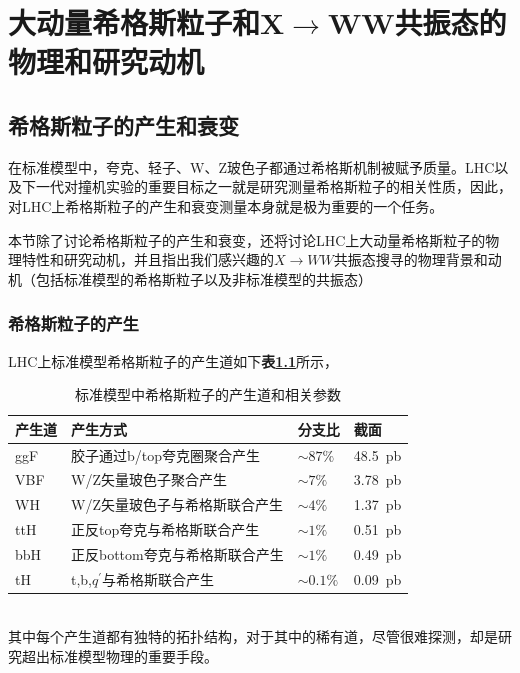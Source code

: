 \chapter{大动量希格斯粒子和X$\to$WW共振态的物理和研究动机}
\label{chap2}
\fontsize{12bp}{14.4pt}

\section{希格斯粒子的产生和衰变}
在标准模型中，夸克、轻子、W、Z玻色子都通过希格斯机制被赋予质量。LHC以及下一代对撞机实验的重要目标之一就是研究测量希格斯粒子的相关性质，因此，对LHC上希格斯粒子的产生和衰变测量本身就是极为重要的一个任务。

本节除了讨论希格斯粒子的产生和衰变，还将讨论LHC上大动量希格斯粒子的物理特性和研究动机，并且指出我们感兴趣的$X\to WW$共振态搜寻的物理背景和动机（包括标准模型的希格斯粒子以及非标准模型的共振态）
\subsection{希格斯粒子的产生}
LHC上标准模型希格斯粒子的产生道如下\textbf{表\ref{table:2.1}}所示，
\begin{table}[htbp]
    \caption{标准模型中希格斯粒子的产生道和相关参数\cite{Higgs_cross_sections}}\label{table:2.1}
    \centering
    \begin{tabular}{>{\centering\arraybackslash}p{2cm}%
    >{\centering\arraybackslash}p{7cm}%
    >{\centering\arraybackslash}p{2cm}%
    >{\centering\arraybackslash}p{2cm}}
    \toprule\toprule
    \textbf{产生道} & \textbf{产生方式} & \textbf{分支比} & \textbf{截面}\\
    \midrule
    ggF & 胶子通过b/top夸克圈聚合产生 & $\sim 87\%$ & \SI{48.5}{pb}\\
    VBF & W/Z矢量玻色子聚合产生 & $\sim7\%$ & \SI{3.78}{pb}\\
    WH & W/Z矢量玻色子与希格斯联合产生 & $\sim 4\%$ & \SI{1.37}{pb}\\
    ttH & 正反top夸克与希格斯联合产生 & $\sim1\%$ & \SI{0.51}{pb}\\
    bbH & 正反bottom夸克与希格斯联合产生 &  $\sim 1\%$ & \SI{0.49}{pb}\\
    tH & t,b,$q^\prime$与希格斯联合产生 & $\sim 0.1\%$ & \SI{0.09}{pb}\\
    \bottomrule\bottomrule
\end{tabular}
\end{table}\\
其中每个产生道都有独特的拓扑结构，对于其中的稀有道，尽管很难探测，却是研究超出标准模型物理的重要手段。

